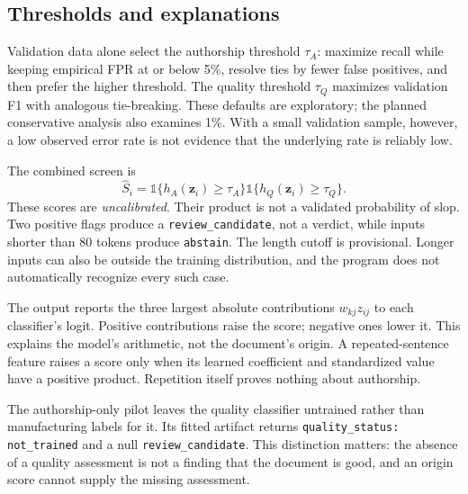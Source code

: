 \documentclass[11pt]{article}
\begin{document}
\subsection{Thresholds and explanations}
Validation data alone select the authorship threshold $\tau_A$: maximize
recall while keeping empirical FPR at or below 5\%, resolve ties by fewer
false positives, and then prefer the higher threshold. The quality threshold
$\tau_Q$ maximizes validation F1 with analogous tie-breaking. These defaults
are exploratory; the planned conservative analysis also examines 1\%.
With a small validation sample, however, a low observed error rate is not
evidence that the underlying rate is reliably low.

The combined screen is
\begin{equation}
 \widehat S_i=\mathbb{1}\{h_A(\mathbf{z}_i)\geq\tau_A\}
              \mathbb{1}\{h_Q(\mathbf{z}_i)\geq\tau_Q\}.
\end{equation}
These scores are \emph{uncalibrated}. Their product is not a validated
probability of slop. Two positive flags produce a
\texttt{review\_candidate}, not a verdict, while inputs shorter than 80 tokens
produce \texttt{abstain}. The length cutoff is provisional. Longer inputs
can also be outside the training distribution, and the program does not
automatically recognize every such case.

The output reports the three largest absolute contributions $w_{kj}z_{ij}$
to each classifier's logit. Positive contributions raise the score; negative
ones lower it. This explains the model's arithmetic, not the document's
origin. A repeated-sentence feature raises a score only when its learned
coefficient and standardized value have a positive product. Repetition itself
proves nothing about authorship.

The authorship-only pilot leaves the quality classifier untrained rather
than manufacturing labels for it. Its fitted artifact returns
\texttt{quality\_status: not\_trained} and a null
\texttt{review\_candidate}. This distinction matters: the absence of a quality
assessment is not a finding that the document is good, and an origin score
cannot supply the missing assessment.
\end{document}

